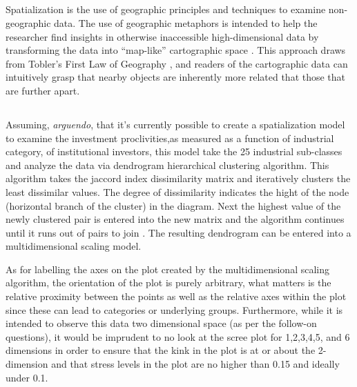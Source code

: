 \documentclass[12pt,letterpaper,notitlepage,onecolumn,final,openbib]{article}
\begin{document}
\subsection{}
Spatialization is the use of geographic principles and techniques to examine non-geographic data\cite{SkupinSpatialization2003}.  The use of geographic metaphors is intended to help the researcher find insights in otherwise inaccessible high-dimensional data by transforming the data into ``map-like'' cartographic space  \cite{SkupinFabrikant2008}.  This approach draws from Tobler's First Law of Geography \cite{toblera1970}, and readers of the cartographic data can intuitively grasp that nearby objects are inherently more related that those that are further apart.      
\subsection{}

Assuming, \textit{arguendo}, that it's currently possible to create a spatialization model to examine the investment proclivities,as measured as a function of industrial category, of institutional investors, this model take the 25 industrial sub-classes and analyze the data via dendrogram hierarchical clustering algorithm.  This algorithm takes the jaccord index dissimilarity matrix and iteratively clusters the least dissimilar values.  The degree of dissimilarity indicates the hight of the node (horizontal branch of the cluster) in the diagram.  Next the highest value of the newly clustered pair is entered into the new matrix and the algorithm continues until it runs out of pairs to join \cite{pathak2014beginning}.   The resulting dendrogram can be entered into a multidimensional scaling model. 

As for labelling the axes on the plot created by the multidimensional scaling algorithm, the orientation of the plot is purely arbitrary, what matters is the relative proximity between the points as well as the relative axes within the plot since these can lead to categories or underlying groups.  Furthermore, while it is intended to observe this data two dimensional space (as per the follow-on questions), it would be imprudent to no look at the scree plot for 1,2,3,4,5, and 6 dimensions in order to ensure that the kink in the plot is at or about the 2-dimension and that stress levels in the plot are no higher than 0.15 and ideally under 0.1.\cite{Vegan}    

\subsection{}
\end{document}
